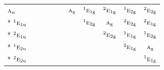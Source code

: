 \documentclass[10pt,a4paper]{article}
\numberwithin{equation}{section}
\newcommand{\irr}[1]{\text{\normalfont\scshape #1}}
\newcommand{\conjpair}[1]{{}^{#1}}
\newcommand{\ptag}[1]{\mathrm{#1}}
\begin{document}
{\begin{longtable}{@{}lcccccccccc@{}}
$\irr{a}_{\ptag{u}}$ &  &  &  &  &  & $\irr{a}_{\ptag{g}}$ & $\conjpair{1}\irr{e}_{1\ptag{g}}$ & $\conjpair{2}\irr{e}_{1\ptag{g}}$ & $\conjpair{1}\irr{e}_{2\ptag{g}}$ & $\conjpair{2}\irr{e}_{2\ptag{g}}$\\*
$\conjpair{1}\irr{e}_{1\ptag{u}}$ &  &  &  &  &  &  & $\conjpair{1}\irr{e}_{2\ptag{g}}$ & $\irr{a}_{\ptag{g}}$ & $\conjpair{2}\irr{e}_{2\ptag{g}}$ & $\conjpair{2}\irr{e}_{1\ptag{g}}$\\*
$\conjpair{2}\irr{e}_{1\ptag{u}}$ &  &  &  &  &  &  &  & $\conjpair{2}\irr{e}_{2\ptag{g}}$ & $\conjpair{1}\irr{e}_{1\ptag{g}}$ & $\conjpair{1}\irr{e}_{2\ptag{g}}$\\*
$\conjpair{1}\irr{e}_{2\ptag{u}}$ &  &  &  &  &  &  &  &  & $\conjpair{2}\irr{e}_{1\ptag{g}}$ & $\irr{a}_{\ptag{g}}$\\*
$\conjpair{2}\irr{e}_{2\ptag{u}}$ &  &  &  &  &  &  &  &  &  & $\conjpair{1}\irr{e}_{1\ptag{g}}$\\
\bottomrule\end{longtable}}
\end{document}
